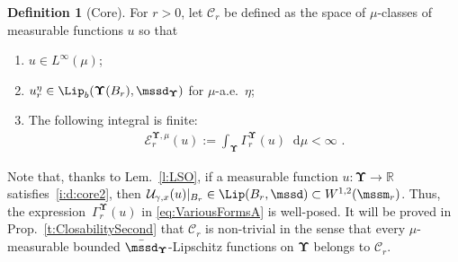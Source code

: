 \documentclass[11pt,letterpaper]{amsart}
\newcommand{\T}{\tau} %
\newcommand{\A}{\Sigma} %
\newcommand{\Bo}[1]{\msB_{#1}} %
\newcommand{\diff}{\mathop{}\!\mathrm{d}}
\newcommand{\paren}[1]{\left(#1\right)}							%
\newcommand{\seq}[1]{\paren{#1}}								%
\newcommand{\R}{{\mathbb R}}
\newcommand{\fstop}{\,\,\mathrm{.}}
\newcommand{\cdc}{\Gamma}
\newcommand{\EE}[2]{\mcE^{#1, #2}}
\newcommand{\QP}{{\mu}}
\newcommand{\dUpsilon}{{\mathbf \Upsilon}}
\newcommand{\U}{\dUpsilon}
\newcommand{\E}{\mathcal E}
\renewcommand{\1}{\mathbf 1}
\renewcommand{\msE}{\mathscr K}
\numberwithin{equation}{section}
\theoremstyle{plain}
\theoremstyle{definition}
\newtheorem{defs}[thm]{Definition}%
\theoremstyle{remark}
\newtheorem{rem}[thm]{\bf Remark}%
\begin{document}
\begin{defs}[Core]\label{d:core}For $r>0$, let $\mathcal C_r$ be defined as the space of $\mu$-classes of measurable functions $u$ so that
\begin{enumerate}[$(a)$]
\item\label{i:d:core1} $u\in L^\infty(\mu)$; 
\item\label{i:d:core2} $u_r^\eta \in \Lip_b(\U(B_r), \mssd_\U)$ for $\QP$-a.e.~$\eta$;


\item\label{i:d:core3}  The following integral is finite:
\begin{align} \label{eq:VariousFormsA} 
\E^{\U, \QP}_{r} (u) :=\int_{\U} \cdc^{\dUpsilon}_r(u) \diff\QP <\infty \fstop
\end{align} 

%
%
\end{enumerate}
Note that, thanks to Lem.~\ref{l:LSO}, if a measurable function $u:\U \to \R$ satisfies~\ref{i:d:core2}, then $\mathcal U_{\gamma, x}(u)|_{B_r} \in \Lip(B_r, \mssd) \subset W^{1,2}(\mssm_r)$. Thus, the expression~$\cdc^{\U}_r(u)$ in \eqref{eq:VariousFormsA} is well-posed. It will be proved in Prop.~\ref{t:ClosabilitySecond} that
$\mathcal C_r$ is non-trivial in the sense that every $\QP$-measurable bounded $\bar{\mssd}_{\U}$-Lipschitz functions on $\U$ belongs to $\mathcal C_r$. 
\end{defs}
\end{document}
